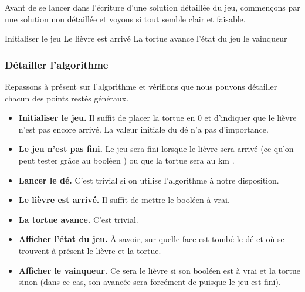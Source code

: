 			Avant de se lancer dans l'écriture d'une solution détaillée du jeu,
			commençons par une solution non détaillée
			et voyons si tout semble clair et faisable.
			
			\begin{LDA}
					\Stmt Initialiser le jeu
							\Stmt Le lièvre est arrivé
						\Else
							\Stmt La tortue avance
						\EndIf
						\Write l'état du jeu
					\EndWhile
					\Write le vainqueur
				\EndAlgo
			\end{LDA}
			
		\subsubsection*{Détailler l'algorithme}
	
			Repassons à présent sur l'algorithme
			et vérifions que nous pouvons détailler 
			chacun des points restés généraux.
			\begin{itemize}
			\item \textbf{Initialiser le jeu.}
				Il suffit de placer la tortue en 0
				et d'indiquer que le lièvre n'est pas encore arrivé.
				La valeur initiale du dé n'a pas d'importance.
			\item \textbf{Le jeu n'est pas fini.}
				Le jeu sera fini lorsque le lièvre sera arrivé
				(ce qu'on peut tester grâce au booléen )
				ou que la tortue sera au km \nbMaxKmTortue{}.
			\item \textbf{Lancer le dé.}
				C'est trivial si on utilise l'algorithme 
				à notre disposition.
			\item \textbf{Le lièvre est arrivé.}
				Il suffit de mettre le booléen  à vrai.
			\item \textbf{La tortue avance.}
				C'est trivial.
			\item \textbf{Afficher l'état du jeu.}
				À savoir, sur quelle face est tombé le dé
				et où se trouvent à présent le lièvre et la tortue.
			\item \textbf{Afficher le vainqueur.}
				Ce sera le lièvre si son booléen est à vrai et la tortue sinon
				(dans ce cas, son avancée sera forcément de \nbMaxKmTortue{} 
				puisque le jeu est fini).
			\end{itemize}

